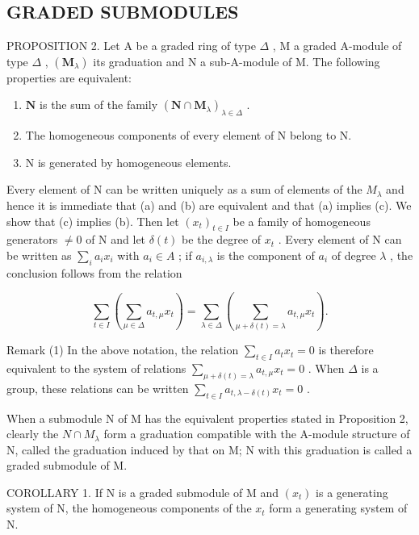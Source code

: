 \subsection{GRADED SUBMODULES}

PROPOSITION 2. Let A be a graded ring of type \(\Delta\) , M a graded A-module of type \(\Delta\) , \((\mathbf{M}_{\lambda})\) its graduation and N a sub-A-module of M. The following properties are equivalent:

\begin{enumerate}
\def\labelenumi{(\alph{enumi})}
\item
  \(\mathbf{N}\) is the sum of the family \((\mathbf{N} \cap \mathbf{M}_{\lambda})_{\lambda \in \Delta}\) .
\item
  The homogeneous components of every element of N belong to N.
\item
  N is generated by homogeneous elements.
\end{enumerate}

Every element of N can be written uniquely as a sum of elements of the \(M_{\lambda}\) and hence it is immediate that (a) and (b) are equivalent and that (a) implies (c). We show that (c) implies (b). Then let \((x_{t})_{t\in I}\) be a family of homogeneous generators \(\neq0\) of N and let \(\delta(t)\) be the degree of \(x_{t}\) . Every element of N can be written as \(\sum_{i}a_{i}x_{i}\) with \(a_{i}\in A\) ; if \(a_{i,\lambda}\) is the component of \(a_{i}\) of degree \(\lambda\) , the conclusion follows from the relation

\[
\sum_ {t \in I} \left(\sum_ {\mu \in \Delta} a _ {t, \mu} x _ {t}\right) = \sum_ {\lambda \in \Delta} \left(\sum_ {\mu + \delta (t) = \lambda} a _ {t, \mu} x _ {t}\right).
\]

Remark (1) In the above notation, the relation \(\sum_{t\in I}a_t x_t = 0\) is therefore equivalent to the system of relations \(\sum_{\mu +\delta (t) = \lambda}a_{t,\mu}x_{t} = 0\) . When \(\Delta\) is a group, these relations can be written \(\sum_{t\in I}a_{t,\lambda -\delta (t)}x_{t} = 0\) .

When a submodule N of M has the equivalent properties stated in Proposition 2, clearly the \(N \cap M_{\lambda}\) form a graduation compatible with the A-module structure of N, called the graduation induced by that on M; N with this graduation is called a graded submodule of M.

COROLLARY 1. If N is a graded submodule of M and \((x_{t})\) is a generating system of N, the homogeneous components of the \(x_{t}\) form a generating system of N.

